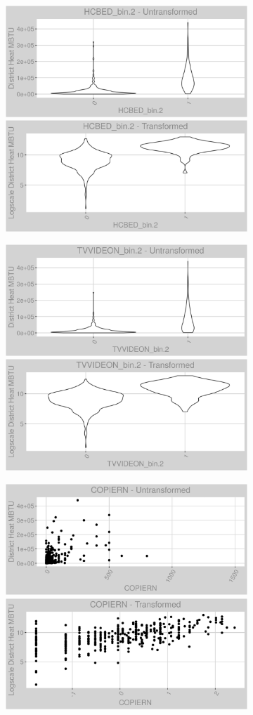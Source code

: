 \FloatBarrier
\newpage
\begin{figure}
\centering
\begin{subfigure}{1\textwidth}
\centering
\includegraphics[width=.49\textwidth, height=0.3\textheight]{Images/district_heat_var_original_3.png}
\includegraphics[width=.49\textwidth, height=0.3\textheight]{Images/district_heat_var_transformed_3.png}
\end{subfigure}
\begin{subfigure}{1\textwidth}
\centering
\includegraphics[width=.49\textwidth, height=0.3\textheight]{Images/district_heat_var_original_4.png}
\includegraphics[width=.49\textwidth, height=0.3\textheight]{Images/district_heat_var_transformed_4.png}
\end{subfigure}
\begin{subfigure}{1\textwidth}
\centering
\includegraphics[width=.49\textwidth, height=0.3\textheight]{Images/district_heat_var_original_5.png}
\includegraphics[width=.49\textwidth, height=0.3\textheight]{Images/district_heat_var_transformed_5.png}
\end{subfigure}
\end{figure}
